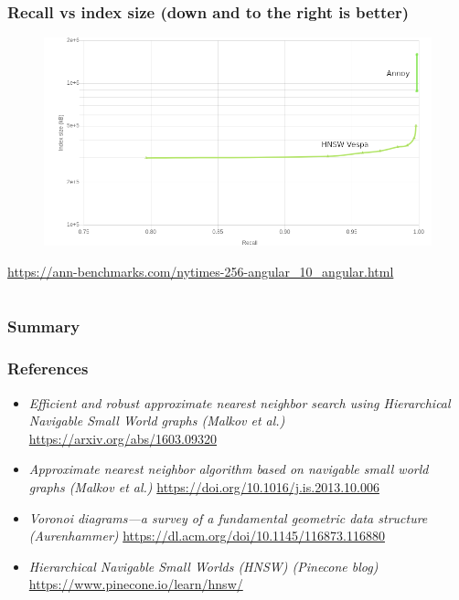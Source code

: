 \documentclass{beamer}
\begin{document}
  \begin{frame}
    \frametitle{Recall vs index size (down and to the right is better)}  
  \begin{figure}[annoy_vs_hnsw_vespa_recall_vs_index_size_nytimes_labels]
    \vspace*{-0.1cm}
  	\includegraphics[scale=0.3]{annoy_vs_hnsw_vespa_recall_vs_index_size_nytimes_labels} 	
  \end{figure} 
  \vspace{-0.3cm}
  \scriptsize \centering \url{https://ann-benchmarks.com/nytimes-256-angular_10_angular.html} 
  \end{frame}


\section{}
  \begin{frame}
    \frametitle{Summary}  
    \Large
   	\begin{itemize}
	\end{itemize}
  \end{frame}

  \begin{frame}
    \frametitle{References}  
    \small
    \begin{itemize}
	\item \textit{Efficient and robust approximate nearest neighbor search using Hierarchical Navigable Small World graphs (Malkov et al.)} \url{https://arxiv.org/abs/1603.09320}    

	\item \textit{Approximate nearest neighbor algorithm based on navigable small world graphs (Malkov et al.)} \url{https://doi.org/10.1016/j.is.2013.10.006}	
	\item \textit{Voronoi diagrams—a survey of a fundamental geometric data structure (Aurenhammer)} \url{https://dl.acm.org/doi/10.1145/116873.116880}
	\item \textit{Hierarchical Navigable Small Worlds (HNSW) (Pinecone blog)} \url{https://www.pinecone.io/learn/hnsw/}
	\end{itemize}
	
  \end{frame}
\end{document}
